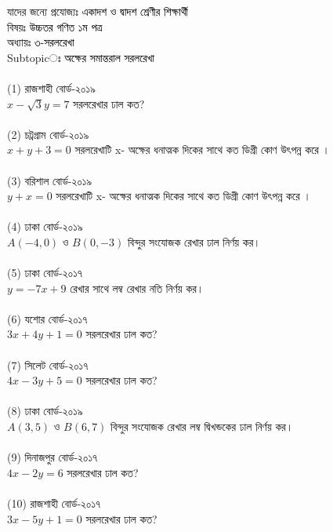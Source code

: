 \documentclass{article}
\begin{document}
 
	\Large
	যাদের জন্যে প্রযোজ্যঃ  	\textcolor{black}{একাদশ ও দ্বাদশ শ্রেণীর শিক্ষার্থী} \\
বিষয়ঃ \textcolor{black}{উচ্চতর গণিত ১ম পত্র} \\
অধ্যায়ঃ \textcolor{black}{৩-সরলরেখা }\\ 
Subtopicঃ \textcolor{black}{অক্ষের সমান্তরাল সরলরেখা}\\	
\\
(1) রাজশাহী বোর্ড-২০১৯\\
$x-\sqrt{3}y=7$ সরলরেখার ঢাল কত?\\
\\
(2) চট্রগ্রাম বোর্ড-২০১৯\\
$x+y+3=0$ সরলরেখাটি x-  অক্ষের ধনাত্মক দিকের সাথে কত ডিগ্রী কোণ উৎপন্ন করে । \\
\\
(3) বরিশাল বোর্ড-২০১৯\\
$y+x=0$ সরলরেখাটি x-  অক্ষের ধনাত্মক দিকের সাথে কত ডিগ্রী কোণ উৎপন্ন করে । \\
\\
(4) ঢাকা বোর্ড-২০১৯\\
$A(-4,0)$ ও $B(0,-3)$ বিন্দুর সংযোজক রেখার ঢাল নির্ণয় কর।\\
\\
(5) ঢাকা বোর্ড-২০১৭\\
$y=-7x+9$ রেখার সাথে লম্ব রেখার নতি নির্ণয় কর।\\
\\
(6) যশোর বোর্ড-২০১৭\\
$3x+4y+1=0$ সরলরেখার ঢাল কত?\\  
\\
(7) সিলেট বোর্ড-২০১৭\\
$4x-3y+5=0$ সরলরেখার ঢাল কত?\\
\\
(8) ঢাকা বোর্ড-২০১৯\\
$A(3,5)$ ও $B(6,7)$ বিন্দুর সংযোজক রেখার লম্ব দ্বিখন্ডকের ঢাল নির্ণয় কর।\\  
\\
(9) দিনাজপুর  বোর্ড-২০১৭\\
$4x-2y=6$ সরলরেখার ঢাল কত?\\
\\
(10) রাজশাহী  বোর্ড-২০১৭\\
$3x-5y+1=0$ সরলরেখার ঢাল কত?\\
\end{document}
